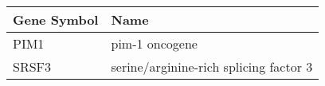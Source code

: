 \begin{tabular}{ll}
\toprule
Gene Symbol &                                   Name \\
\midrule
       PIM1 &                         pim-1 oncogene \\
      SRSF3 & serine/arginine-rich splicing factor 3 \\
\bottomrule
\end{tabular}
